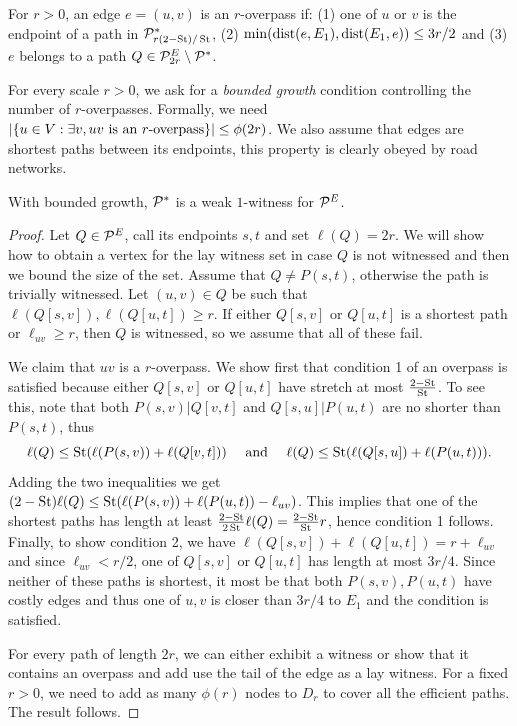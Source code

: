 \documentclass[letterpaper,11pt]{article}
\begin{document}
\begin{definition}[Overpass]
For $r>0$, an edge $e=(u,v)$ is an $r$-overpass if: (1) one of $u$ or $v$ is the endpoint of a path in $\mathcal{P}^*_{r(2-\operatorname{St})/\operatorname{St}}$, (2) $\min(\mbox{dist}(e,E_1),\mbox{dist}(E_1,e))\leq 3r/2$ and (3) $e$ belongs to a path $Q\in\mathcal{P}^E_{2r}\setminus\mathcal{P}^*$.
\end{definition} 


For every scale $r>0$, we ask for a \emph{bounded growth} condition controlling the number of $r$-overpasses.
Formally, we need $\lvert\{u\in V: \exists v, uv \text{ is an $r$-overpass}\}\rvert\leq \phi(2r)$.
We also assume that edges are shortest paths between its endpoints, this property is clearly obeyed by road networks.

\begin{proposition}
With bounded growth, $\mathcal{P}^*$ is a weak $1$-witness for $\mathcal{P}^E$.
\end{proposition}
\begin{proof}
Let $Q\in\mathcal{P}^E$, call its endpoints $s,t$ and set $\ell(Q)=2r$.
We will show how to obtain a vertex for the lay witness set in case $Q$ is not witnessed and then we bound the size of the set.
Assume that $Q\neq P(s,t)$, otherwise the path is trivially witnessed.
Let $(u,v)\in Q$ be such that $\ell(Q[s,v]),\ell(Q[u,t])\geq r$. 
If either $Q[s,v]$ or $Q[u,t]$ is a shortest path or $\ell_{uv}\geq r$, then $Q$ is witnessed, so we assume that all of these fail.

We claim that $uv$ is a $r$-overpass.
We show first that condition 1 of an overpass is satisfied because either $Q[s,v]$ or $Q[u,t]$ have stretch at most $\frac{2-\operatorname{St}}{\operatorname{St}}$.
To see this, note that both $P(s,v)|Q[v,t]$ and $Q[s,u]|P(u,t)$ are no shorter than $P(s,t)$, thus 
\[
\ell(Q) \leq \operatorname{St}( \ell(P(s,v)) + \ell(Q[v,t])) \quad \text{ and }\quad
\ell(Q) \leq \operatorname{St}( \ell(Q[s,u]) + \ell(P(u,t))).
\]
Adding the two inequalities we get $(2-\operatorname{St})\ell(Q) \leq \operatorname{St}(\ell(P(s,v))+\ell(P(u,t))-\ell_{uv})$.
This implies that one of the shortest paths has length at least $\frac{2-\operatorname{St}}{2\operatorname{St}}\ell(Q)=\frac{2-\operatorname{St}}{\operatorname{St}}r$, hence condition 1 follows.
Finally, to show condition 2, we have $\ell(Q[s,v])+\ell(Q[u,t])=r+\ell_{uv}$ and since $\ell_{uv}<r/2$, one of $Q[s,v]$ or $Q[u,t]$ has length at most $3r/4$.
Since neither of these paths is shortest, it most be that both $P(s,v),P(u,t)$ have costly edges and thus one of $u,v$ is closer than $3r/4$ to $E_1$ and the condition is satisfied.

For every path of length $2r$, we can either exhibit a witness or show that it contains an overpass and add use the tail of the edge as a lay witness.
For a fixed $r>0$, we need to add as many $\phi(r)$ nodes to $D_r$ to cover all the efficient paths. 
The result follows.
\end{proof}
\end{document}
